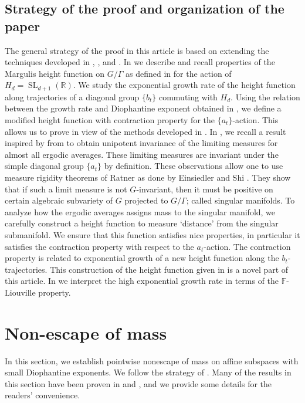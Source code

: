 \documentclass[12pt,reqno]{amsart}
\newcommand{\SL}{\operatorname{SL}}
\numberwithin{equation}{section}
\theoremstyle{plain}
\theoremstyle{definition}
\theoremstyle{remark}
\newcommand\bbF{\mathbb{F}}
\newcommand{\R}{\mathbb{R}}
\begin{document}
\subsection{Strategy of the proof and organization of the paper}
The general strategy of the proof in this article is based on extending the techniques developed in \cite{Shi20}, \cite{PSS23}, and \cite{SY24TAMS}. In  we describe and recall properties of the Margulis height function on $G/\Gamma$ as defined in \cite{BQ12} for the action of $H_d=\SL_{d+1}(\R)$. We study the exponential growth rate of the height function along trajectories of a diagonal group $\{b_t\}$ commuting with $H_d$. Using the relation between the growth rate and Diophantine exponent obtained in \cite{SY24TAMS}, we define a modified height function with contraction property for the $\{a_t\}$-action. This allows us to prove  in view of the methods developed in \cite{Shi20}.  In , we recall a result inspired by \cite{CE15} from \cite{Shi20} to obtain unipotent invariance of the limiting measures for almost all ergodic averages. These limiting measures are invariant under the simple diagonal group $\{a_t\}$ by definition. These observations allow one to use measure rigidity theorems of Ratner \cite{Ratner:measure} as done by Einsiedler and Shi \cite{EinsiedlerShi19}. They show that if such a limit measure is not $G$-invariant, then it must be positive on certain algebraic subvariety of $G$ projected to $G/\Gamma$; called singular manifolds. To analyze how the ergodic averages assigns mass to the singular manifold, we carefully construct a height function to measure `distance' from the singular submanifold. We ensure that this function satisfies nice properties, in particular it satisfies the contraction property with respect to the $a_t$-action. The contraction property is related to exponential growth of a new height function along the $b_t$-trajectories. This construction of the height function given in  is a novel part of this article.  In  we interpret the high exponential growth rate in terms of the $\bbF$-Liouville property. 
    
	\section{Non-escape of mass}
	\label{sec:non-escape}
	In this section, we establish pointwise nonescape of mass on affine subspaces with small Diophantine exponents. We follow the strategy of \cite[Section 4]{Shi20}. Many of the results in this section have been proven in \cite{Shi20} and \cite{SY24TAMS}, and we provide some details for the readers' convenience.
\end{document}
